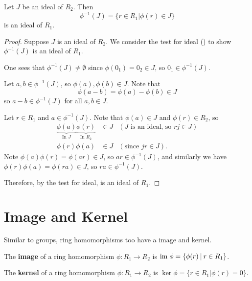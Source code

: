 \begin{proposition}\label{prop-inverse-homomorphism-on-ideal-is-ideal}
    Let $J$ be an ideal of $R_2$. Then
    \[
        \phi^{-1}(J) = \{r \in R_1 \vert \phi(r) \in J\}
    \]
    is an ideal of $R_1$.
\end{proposition}
\begin{proof}
    Suppose $J$ is an ideal of $R_2$. We consider the test for ideal () to show $\phi^{-1}(J)$ is an ideal of $R_1$.
    
    One sees that $\phi^{-1}(J) \neq \emptyset$ since $\phi(0_1) = 0_2 \in J$, so $0_1 \in \phi^{-1}(J)$.

    Let $a, b \in \phi^{-1}(J)$, so $\phi(a), \phi(b) \in J$. Note that
    \[
        \phi(a-b) = \phi(a) - \phi(b) \in J
    \]
    so $a-b \in \phi^{-1}(J)$ for all $a,b \in J$.

    Let $r \in R_1$ and $a \in \phi^{-1}(J)$. Note that $\phi(a) \in J$ and $\phi(r) \in R_2$, so
    \begin{align*}
        \underbrace{\phi(a)}_{\text{In }J}\underbrace{\phi(r)}_{\text{In }R_2} &\in J & (J\text{ is an ideal, so } rj \in J)\\
        \phi(r)\phi(a) &\in J & (\text{since } jr \in J).
    \end{align*}
    Note $\phi(a)\phi(r) = \phi(ar) \in J$, so $ar \in \phi^{-1}(J)$, and similarly we have $\phi(r)\phi(a) = \phi(ra) \in J$, so $ra \in \phi^{-1}(J)$.

    Therefore, by the test for ideal, is an ideal of $R_1$.
\end{proof}

\section{Image and Kernel}
Similar to groups, ring homomorphisms too have a image and kernel.
\begin{definition}
    The \textbf{image} of a ring homomorphism $\phi: R_1 \to R_2$ is $\im\phi = \{\phi(r) \vert r \in R_1\}$.
\end{definition}
\begin{definition}
    The \textbf{kernel} of a ring homomorphism $\phi:R_1 \to R_2$ is $\ker\phi = \{r \in R_1 \vert \phi(r) = 0\}$.
\end{definition}


